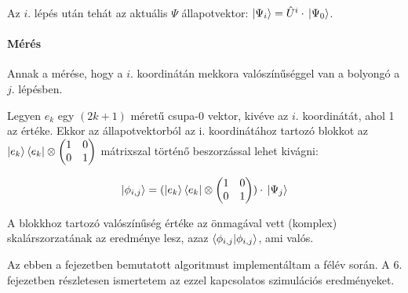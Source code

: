 Az $i.$ lépés után tehát az aktuális $\Psi$ állapotvektor: $\ket{\Psi_i} =
  {\hat{U}}^i\cdot{}\ket{\Psi_0}$.

\paragraph{Mérés}

Annak a mérése, hogy a $i.$ koordinátán mekkora valószínűséggel van a bolyongó
a $j.$ lépésben.

Legyen $e_k$ egy $(2k+1)$ méretű csupa-0 vektor, kivéve az $i.$ koordinátát,
ahol 1 az értéke. Ekkor az állapotvektorból az i. koordinátához tartozó blokkot
az $\ket{e_k}\bra{e_k} \otimes \begin{pmatrix} 1 & 0 \\ 0 & 1 \end{pmatrix}$
mátrixszal történő beszorzással lehet kivágni:

\begin{center} \[ \ket{\phi_{i,j}} =
    (\ket{e_k}\bra{e_k} \otimes
    \begin{pmatrix} 1 & 0 \\ 0 & 1 \end{pmatrix})
    \cdot{} \ket{\Psi_j} \]
\end{center}

A blokkhoz tartozó valószínűség értéke az önmagával vett
(komplex) skalárszorzatának az eredménye lesz, azaz $\braket{\phi_{i,j}}$, ami valós.

Az ebben a fejezetben bemutatott algoritmust implementáltam a félév során. A 6.
fejezetben részletesen ismertetem az ezzel kapcsolatos szimulációs
eredményeket.